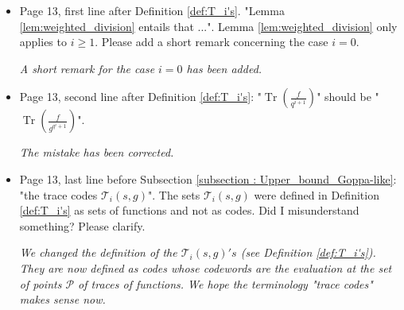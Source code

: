 \documentclass[12pt,a4paper]{amsart}
\DeclareMathOperator{\trace}{Tr}
\newcommand{\Tr}[1]{\trace\!\left(#1\right)}
\begin{document}
\begin{itemize}
\item Page 13, first line after Definition \ref{def:T_i's}. "Lemma \ref{lem:weighted_division} entails that ...". Lemma \ref{lem:weighted_division} only applies to $i \ge 1$. Please add a short remark concerning the case $i=0$.

\textit{A short remark for the case $i=0$ has been added.} 

\item Page 13, second line after Definition \ref{def:T_i's}: "$\Tr{\frac{f}{q^{i+1}}}$" should be "$\Tr{\frac{f}{g^{q^i+1}}}$".

\textit{The mistake has been corrected.}

\item Page 13, last line before Subsection \ref{subsection : Upper_bound_Goppa-like}: "the trace codes $\mathcal{T}_i(s,g)$". The sets $\mathcal{T}_i(s,g)$ were defined in Definition \ref{def:T_i's} as sets of functions and not as codes. Did I misunderstand something? Please clarify.

\textit{We changed the definition of the $\mathcal{T}_i(s,g)'s$ (see Definition \ref{def:T_i's}). They are now defined as codes whose codewords are the evaluation at the set of points $\mathcal{P}$ of traces of functions. We hope the terminology "trace codes" makes sense now.}

\end{itemize}
\end{document}
